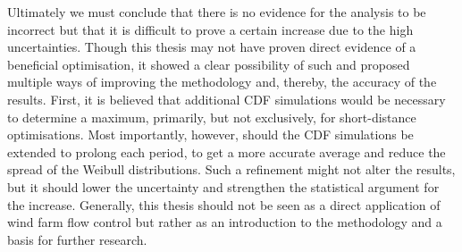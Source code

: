 Ultimately we must conclude that there is no evidence for the analysis to be incorrect but that it is difficult to prove a certain increase due to the high uncertainties. Though this thesis may not have proven direct evidence of a beneficial optimisation, it showed a clear possibility of such and proposed multiple ways of improving the methodology and, thereby, the accuracy of the results. First, it is believed that additional CDF simulations would be necessary to determine a maximum, primarily, but not exclusively, for short-distance optimisations. Most importantly, however, should the CDF simulations be extended to prolong each period, to get a more accurate average and reduce the spread of the Weibull distributions. Such a refinement might not alter the results, but it should lower the uncertainty and strengthen the statistical argument for the increase. Generally, this thesis should not be seen as a direct application of wind farm flow control but rather as an introduction to the methodology and a basis for further research. 
